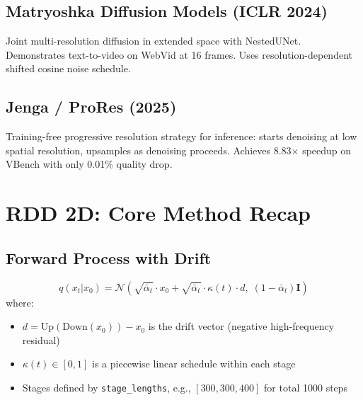 \documentclass[11pt,a4paper]{article}
\begin{document}
\subsection{Matryoshka Diffusion Models (ICLR 2024)}

Joint multi-resolution diffusion in extended space with NestedUNet. Demonstrates text-to-video on WebVid at 16 frames. Uses resolution-dependent shifted cosine noise schedule.

\subsection{Jenga / ProRes (2025)}

Training-free progressive resolution strategy for inference: starts denoising at low spatial resolution, upsamples as denoising proceeds. Achieves 8.83$\times$ speedup on VBench with only 0.01\% quality drop.

\section{RDD 2D: Core Method Recap}

\subsection{Forward Process with Drift}
\begin{equation}
q(x_t | x_0) = \mathcal{N}\left(\sqrt{\bar\alpha_t} \cdot x_0 + \sqrt{\bar\alpha_t} \cdot \kappa(t) \cdot d, \; (1-\bar\alpha_t)\mathbf{I}\right)
\end{equation}
where:
\begin{itemize}[nosep]
\item $d = \text{Up}(\text{Down}(x_0)) - x_0$ is the drift vector (negative high-frequency residual)
\item $\kappa(t) \in [0,1]$ is a piecewise linear schedule within each stage
\item Stages defined by \texttt{stage\_lengths}, e.g., $[300, 300, 400]$ for total 1000 steps
\end{itemize}
\end{document}
